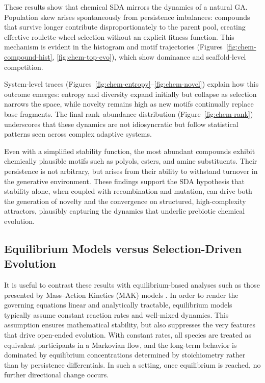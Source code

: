 \documentclass[life,article,submit,pdftex,moreauthors]{Definitions/mdpi}
\begin{document}
These results show that chemical SDA mirrors the dynamics of a natural GA. Population skew arises spontaneously from persistence imbalances: compounds that survive longer contribute disproportionately to the parent pool, creating effective roulette-wheel selection without an explicit fitness function. This mechanism is evident in the histogram and motif trajectories (Figures~\ref{fig:chem-compound-hist}, \ref{fig:chem-top-evo}), which show  dominance and scaffold-level competition.  

System-level traces (Figures~\ref{fig:chem-entropy}--\ref{fig:chem-novel}) explain how this outcome emerges: entropy and diversity expand initially but collapse as selection narrows the space, while novelty remains high as new motifs continually replace base fragments. The final rank–abundance distribution (Figure~\ref{fig:chem-rank}) underscores that these dynamics are not idiosyncratic but follow statistical patterns seen across complex adaptive systems.  

Even with a simplified stability function, the most abundant compounds exhibit chemically plausible motifs such as polyols, esters, and amine substituents. Their persistence is not arbitrary, but arises from their ability to withstand turnover in the generative environment. These findings support the SDA hypothesis that stability alone, when coupled with recombination and mutation, can drive both the generation of novelty and the convergence on structured, high-complexity attractors, plausibly capturing the dynamics that underlie prebiotic chemical evolution.  


\subsection{Equilibrium Models versus Selection-Driven Evolution}

It is useful to contrast these results with equilibrium-based analyses such as those presented by Mass–Action Kinetics (MAK) models
\cite{fogler1999chemical,TuranyiTomlin2014}. In order to render the governing equations linear and analytically tractable, equilibrium models typically assume constant reaction rates and well-mixed dynamics. This assumption ensures mathematical stability, but also suppresses the very features that drive open-ended evolution. With constant rates, all species are treated as equivalent participants in a Markovian flow, and the long-term behavior is dominated by equilibrium concentrations determined by stoichiometry rather than by persistence differentials. In such a setting, once equilibrium is reached, no further directional change occurs.
\end{document}
